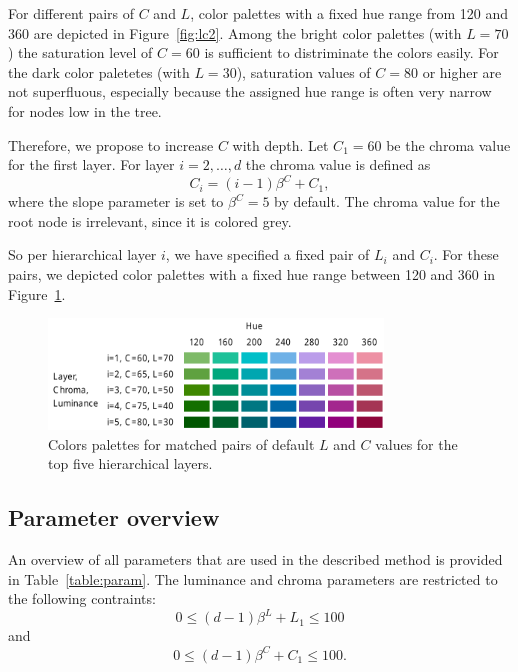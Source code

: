 \documentclass[journal]{vgtc}                %
\begin{document}
For different pairs of $C$ and $L$, color palettes with a fixed hue range from 120 and 360 are depicted in Figure~\ref{fig:lc2}. Among the bright color palettes (with $L=70$) the saturation level of $C=60$ is sufficient to distriminate the colors easily. For the dark color paletetes (with $L=30$), saturation values of $C=80$ or higher are not superfluous, especially because the assigned hue range is often very narrow for nodes low in the tree.

Therefore, we propose to increase $C$ with depth. Let $C_1=60$ be the chroma value for the first layer. For layer $i=2,\ldots, d$ the chroma value is defined as
\begin{equation}
C_i=(i-1)\beta^C + C_1,
\end{equation}
where the slope parameter is set to $\beta^C=5$ by default. The chroma value for the root node is irrelevant, since it is colored grey.

So per hierarchical layer $i$, we have specified a fixed pair of $L_i$ and $C_i$. For these pairs, we depicted color palettes with a fixed hue range between 120 and 360 in Figure~\ref{fig:lc3}.

\begin{figure}[tb]
  \centering
  \includegraphics[width=3.5in]{LC3.pdf}
  \caption{Colors palettes for matched pairs of default $L$ and $C$ values for the top five hierarchical layers.}\label{fig:lc3}
\end{figure}



\subsection{Parameter overview}

An overview of all parameters that are used in the described method is provided in Table~\ref{table:param}. The luminance and chroma parameters are restricted to the following contraints:
\begin{equation}
0 \leq (d-1)\beta^L + L_1 \leq 100
\end{equation}
and 
\begin{equation}
0 \leq (d-1)\beta^C + C_1 \leq 100.
\end{equation}
\end{document}
